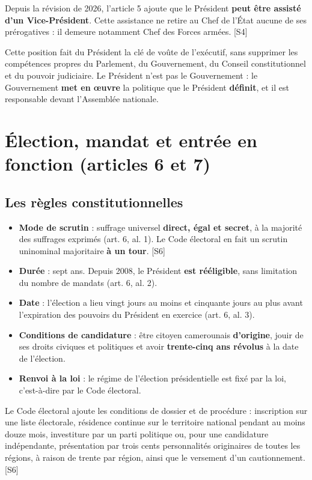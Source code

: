 \documentclass[11pt,a4paper,oneside]{report}
\newcommand{\src}[1]{\textcolor{bluec}{\scriptsize[#1]}}
\begin{document}
Depuis la révision de 2026, l'article 5 ajoute que le Président \textbf{peut être assisté d'un Vice-Président}. Cette assistance ne retire au Chef de l'État aucune de ses prérogatives : il demeure notamment Chef des Forces armées. \src{S4}

Cette position fait du Président la clé de voûte de l'exécutif, sans supprimer les compétences propres du Parlement, du Gouvernement, du Conseil constitutionnel et du pouvoir judiciaire. Le Président n'est pas le Gouvernement : le Gouvernement \textbf{met en œuvre} la politique que le Président \textbf{définit}, et il est responsable devant l'Assemblée nationale.

\section{Élection, mandat et entrée en fonction (articles 6 et 7)}
\subsection{Les règles constitutionnelles}
\begin{itemize}
  \item \textbf{Mode de scrutin} : suffrage universel \textbf{direct, égal et secret}, à la majorité des suffrages exprimés (art. 6, al. 1). Le Code électoral en fait un scrutin uninominal majoritaire \textbf{à un tour}. \src{S6}
  \item \textbf{Durée} : sept ans. Depuis 2008, le Président \textbf{est rééligible}, sans limitation du nombre de mandats (art. 6, al. 2).
  \item \textbf{Date} : l'élection a lieu vingt jours au moins et cinquante jours au plus avant l'expiration des pouvoirs du Président en exercice (art. 6, al. 3).
  \item \textbf{Conditions de candidature} : être citoyen camerounais \textbf{d'origine}, jouir de ses droits civiques et politiques et avoir \textbf{trente-cinq ans révolus} à la date de l'élection.
  \item \textbf{Renvoi à la loi} : le régime de l'élection présidentielle est fixé par la loi, c'est-à-dire par le Code électoral.
\end{itemize}
Le Code électoral ajoute les conditions de dossier et de procédure : inscription sur une liste électorale, résidence continue sur le territoire national pendant au moins douze mois, investiture par un parti politique ou, pour une candidature indépendante, présentation par trois cents personnalités originaires de toutes les régions, à raison de trente par région, ainsi que le versement d'un cautionnement. \src{S6}
\end{document}
